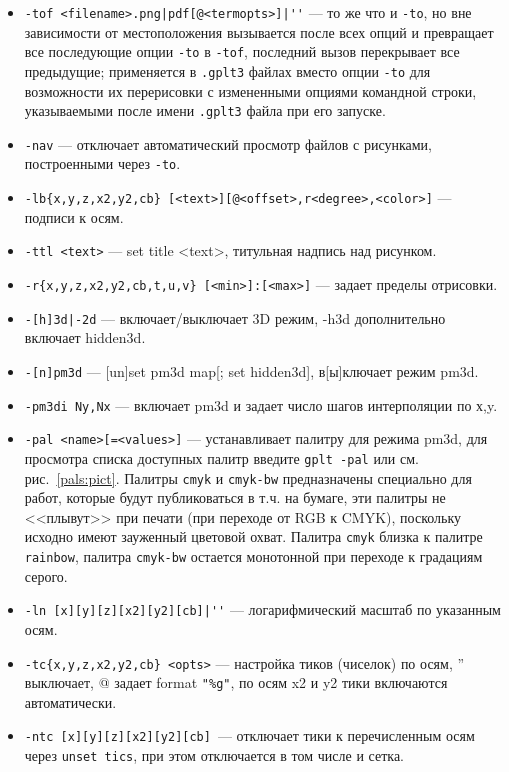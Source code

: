 \documentclass[12pt]{article}
\begin{document}
\begin{itemize}
  и продолжает разбор аргументов, выключает режим multiplot.
\item \verb:-tof <filename>.png|pdf[@<termopts>]|'': --- то же что и \verb'-to', но вне зависимости 
  от местоположения вызывается после всех опций и превращает все последующие
   опции \verb'-to' в \verb'-tof', последний вызов перекрывает все предыдущие; применяется в
   \verb'.gplt3' файлах вместо опции \verb'-to' для возможности их перерисовки с измененными опциями командной строки, указываемыми после имени
   \verb'.gplt3' файла при его запуске.
 \item \verb'-nav' --- отключает автоматический просмотр файлов с рисунками, построенными  через \verb'-to'.                     
\item \verb'-lb{x,y,z,x2,y2,cb} [<text>][@<offset>,r<degree>,<color>]' --- подписи к осям.
\item \verb'-ttl <text>' --- set title <text>, титульная надпись над рисунком.
\item \verb'-r{x,y,z,x2,y2,cb,t,u,v} [<min>]:[<max>]' --- задает пределы отрисовки.
\item \verb'-[h]3d|-2d' --- включает/выключает 3D режим, -h3d дополнительно включает hidden3d.
\item \verb'-[n]pm3d' --- [un]set pm3d map[; set hidden3d], в[ы]ключает режим pm3d.
\item \verb'-pm3di Ny,Nx' --- включает pm3d и задает число шагов интерполяции по х,y.
\item \verb'-pal <name>[=<values>]' --- устанавливает палитру для режима pm3d, для просмотра списка
  доступных палитр введите \verb'gplt -pal' или см. рис.~\ref{pals:pict}.
  Палитры \verb'cmyk' и \verb'cmyk-bw' предназначены специально для работ, которые будут публиковаться в т.ч. на бумаге,
  эти палитры не <<плывут>> при печати (при переходе от RGB к CMYK),
  поскольку исходно имеют зауженный цветовой охват. Палитра \verb'cmyk'  близка к палитре \verb'rainbow', палитра \verb'cmyk-bw'
  остается монотонной при переходе к градациям серого.
\item \verb:-ln [x][y][z][x2][y2][cb]|'': --- логарифмический масштаб по указанным осям.
\item \verb'-tc{x,y,z,x2,y2,cb} <opts>'  --- настройка тиков (чиселок) по осям, '' выключает,
             @ задает format \verb'"%g"', по осям x2 и y2 тики включаются автоматически. 
\item \verb'-ntc [x][y][z][x2][y2][cb]'~--- отключает тики к перечисленным осям через \verb'unset tics',
  при этом отключается в том числе и сетка.

\end{itemize}
\end{document}
